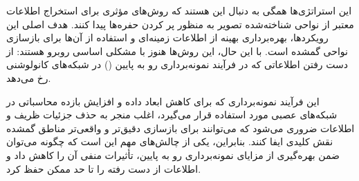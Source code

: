 این استراتژی‌ها همگی به دنبال این هستند که روش‌های مؤثری برای استخراج اطلاعات معتبر از نواحی شناخته‌شده تصویر به منظور پر کردن حفره‌ها پیدا کنند. هدف اصلی این رویکردها، بهره‌برداری بهینه از اطلاعات زمینه‌ای و استفاده از آن‌ها برای بازسازی نواحی گمشده است. با این حال، این روش‌ها هنوز با مشکلی اساسی روبرو هستند: از دست رفتن اطلاعاتی که در فرآیند نمونه‌برداری رو به پایین () در شبکه‌های کانولوشنی رخ می‌دهد.  

این فرآیند نمونه‌برداری که برای کاهش ابعاد داده و افزایش بازده محاسباتی در شبکه‌های عصبی مورد استفاده قرار می‌گیرد، اغلب منجر به حذف جزئیات ظریف و اطلاعات ضروری می‌شود که می‌توانند برای بازسازی دقیق‌تر و واقعی‌تر مناطق گمشده نقش کلیدی ایفا کنند. بنابراین، یکی از چالش‌های مهم این است که چگونه می‌توان ضمن بهره‌گیری از مزایای نمونه‌برداری رو به پایین، تأثیرات منفی آن را کاهش داد و اطلاعات از دست رفته را تا حد ممکن حفظ کرد.